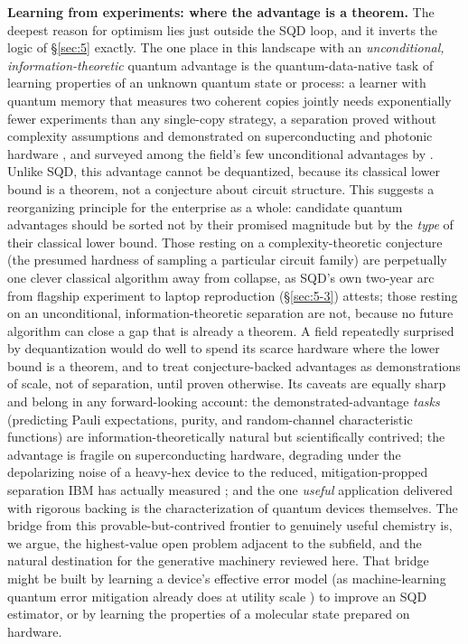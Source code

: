 \documentclass[11pt]{article}
\begin{document}
\textbf{Learning from experiments: where the advantage is a theorem.} The deepest reason for optimism lies just outside the SQD loop, and it inverts the logic of \S\ref{sec:5} exactly. The one place in this landscape with an \emph{unconditional, information-theoretic} quantum advantage is the quantum-data-native task of learning properties of an unknown quantum state or process: a learner with quantum memory that measures two coherent copies jointly needs exponentially fewer experiments than any single-copy strategy, a separation proved without complexity assumptions \cite{chen2021} and demonstrated on superconducting and photonic hardware \cite{huang2022,liuphotonic2025}, and surveyed among the field's few unconditional advantages by \cite{huang2025}. Unlike SQD, this advantage cannot be dequantized, because its classical lower bound is a theorem, not a conjecture about circuit structure. This suggests a reorganizing principle for the enterprise as a whole: candidate quantum advantages should be sorted not by their promised magnitude but by the \emph{type} of their classical lower bound. Those resting on a complexity-theoretic conjecture (the presumed hardness of sampling a particular circuit family) are perpetually one clever classical algorithm away from collapse, as SQD's own two-year arc from flagship experiment to laptop reproduction (\S\ref{sec:5-3}) attests; those resting on an unconditional, information-theoretic separation are not, because no future algorithm can close a gap that is already a theorem. A field repeatedly surprised by dequantization would do well to spend its scarce hardware where the lower bound is a theorem, and to treat conjecture-backed advantages as demonstrations of scale, not of separation, until proven otherwise. Its caveats are equally sharp and belong in any forward-looking account: the demonstrated-advantage \emph{tasks} (predicting Pauli expectations, purity, and random-channel characteristic functions) are information-theoretically natural but scientifically contrived; the advantage is fragile on superconducting hardware, degrading under the depolarizing noise of a heavy-hex device \cite{cotler2025} to the reduced, mitigation-propped separation IBM has actually measured \cite{seif2024}; and the one \emph{useful} application delivered with rigorous backing is the characterization of quantum devices themselves. The bridge from this provable-but-contrived frontier to genuinely useful chemistry is, we argue, the highest-value open problem adjacent to the subfield, and the natural destination for the generative machinery reviewed here. That bridge might be built by learning a device's effective error model (as machine-learning quantum error mitigation already does at utility scale \cite{liao2024}) to improve an SQD estimator, or by learning the properties of a molecular state prepared on hardware.
\end{document}
